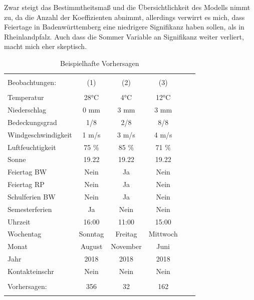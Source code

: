 \documentclass[a4paper,12pt]{thesis}
\begin{document}
Zwar steigt das Bestimmtheitsmaß und die Übersichtlichkeit des Modells nimmt zu, da die Anzahl der Koeffizienten abnimmt, allerdings verwirrt es mich, dass Feiertage in Badenwürttemberg eine niedrigere Signifikanz haben sollen, als in Rheinlandpfalz. Auch dass die Sommer Variable an Signifikanz weiter verliert, macht mich eher skeptisch.

\begin{table}[!htbp] \centering 
	\caption{Beispielhafte Vorhersagen} 
	\label{ForecastsExample} 
	\begin{tabular}{@{\extracolsep{-5pt}}lccccc} 
		\\[-1.8ex]\hline 
		\hline \\[-1.8ex] 
		Beobachtungen: & (1) & (2) & (3) \\ 
		\hline \\[-1.8ex] 
		Temperatur & 28°C & 4°C & 12°C\\
		Niederschlag & 0 mm & 3 mm &  3 mm\\
		Bedeckungsgrad & 1/8 & 2/8 & 8/8\\
		Windgeschwindigkeit &  1 m/s & 3 m/s & 4 m/s\\
		Luftfeuchtigkeit &  75 \% & 85 \% & 71 \% \\
		Sonne & 19.22 & 19.22 & 19.22\\
		Feiertag BW & Nein & Ja & Nein \\
		Feiertag RP & Nein & Ja & Nein \\
		Schulferien BW & Nein & Ja & Nein \\
		Semesterferien & Ja & Nein & Nein \\
		Uhrzeit & 16:00 & 11:00 & 15:00 \\
		Wochentag & Sonntag & Freitag & Mittwoch \\
		Monat & August & November & Juni \\
		Jahr & 2018 & 2018 & 2018 \\
		Kontakteinschr & Nein & Nein & Nein \\
		\hline \\[-1.8ex]
		Vorhersagen: & 356 & 32 & 162 \\ 
		\hline \\[-1.8ex] 
	\end{tabular} 
\end{table} 

\newpage
{}

\end{document}
